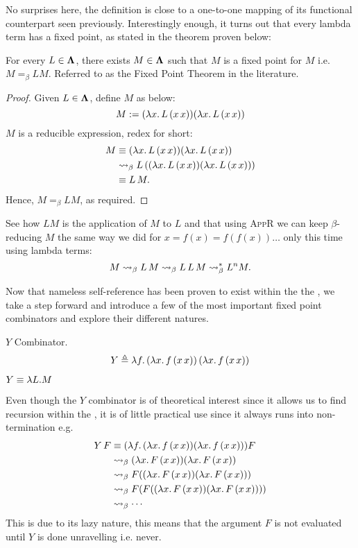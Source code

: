 No surprises here, the definition is close to a one-to-one mapping of its functional counterpart seen previously. Interestingly enough, it turns out that every lambda term has a fixed point, as stated in the theorem proven below:
\begin{theorem}
  For every \( L \in \mathbf{\Lambda} \), there exists \( M \in \mathbf{\Lambda} \) such that $ M $ is a fixed point for $ M $ i.e. $ M =_\beta L M $. Referred to as the Fixed Point Theorem in the literature.
\end{theorem}
\begin{proof} Given $L \in \mathbf{\Lambda}$, define $M$ as below:
  \[
    M := (\lambda x . \, L \, (x \, x))(\lambda x . \, L \, (x \, x))
  \]
  $M$ is a reducible expression, redex for short:
  \begin{align*}
    M 
    &\equiv (\lambda x . \, L \, (x \, x))(\lambda x . \, L \, (x \, x)) \\
    &\mathrel{\leadsto}_\beta L \, ((\lambda x . \, L \, (x \, x))(\lambda x . \, L\, (x \, x))) \\
    &\equiv L \, M.
  \end{align*}
  Hence, $ M =_\beta L M $, as required.
\end{proof}
\begin{remark}
  See how $ L M $ is the application of $ M $ to $ L $ and that using \textsc{AppR} we can keep $\beta$-reducing $ M $ the same way we did for $ x = f(x) = f(f(x))\dots $ only this time using lambda terms:
  \[
    M \mathrel{\leadsto}_\beta L \, M \mathrel{\leadsto}_\beta L \, L \, M \mathrel{\leadsto}_\beta^* L^n M.
  \]
\end{remark}
Now that nameless self-reference has been proven to exist within the the \lcalc, we take a step forward and introduce a few of the most important fixed point combinators and explore their different natures.
\begin{definition} $Y$ Combinator. 
\[
  Y \triangleq \lambda f.\, (\lambda x.\, f\, (x\, x))\, (\lambda x.\, f\, (x\, x))
\]
\end{definition}
\begin{note}
  \( Y \equiv \lambda L . M  \) 
\end{note}
\begin{remark}
  Even though the $Y$ combinator is of theoretical interest since it allows us to find recursion within the \lcalc, it is of little practical use since it always runs into non-termination e.g.
  \[
    \begin{aligned}
      Y \, F &\equiv (\lambda f. \, (\lambda x . \, f \, (x \, x))(\lambda x . \, f \, (x \, x))) F \\
      &\mathrel{\leadsto}_\beta (\lambda x . \, F \, (x \, x))(\lambda x . \, F \, (x \, x)) \\
             &\mathrel{\leadsto}_\beta F((\lambda x . \, F \, (x \, x))(\lambda x . \, F \, (x \, x))) \\
             &\mathrel{\leadsto}_\beta F(F((\lambda x . \, F \, (x \, x))(\lambda x . \, F \, (x \, x)))) \\
             &\mathrel{\leadsto}_\beta \cdots
    \end{aligned}
  \]
  This is due to its lazy nature, this means that the argument $F$ is not evaluated until $Y$ is done unravelling i.e. never.
\end{remark}
